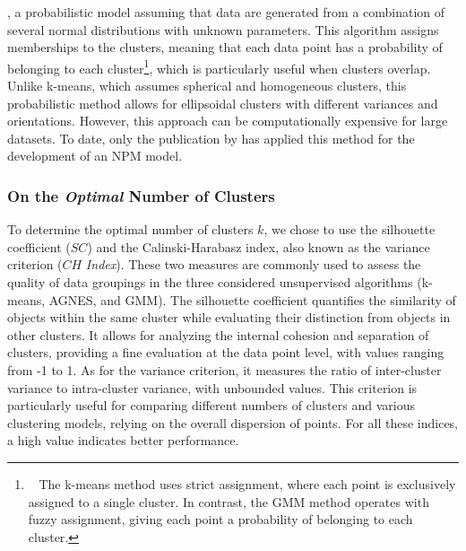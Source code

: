 \begin{refsegment}
\begin{customitemize}
{    }, a probabilistic model assuming that data are generated from a combination of several normal distributions with unknown parameters. This algorithm assigns  memberships to the clusters, meaning that each data point has a probability of belonging to each cluster\footnote{~
        The k-means method uses strict assignment, where each point is exclusively assigned to a single cluster. In contrast, the \acrshort{GMM} method operates with fuzzy assignment, giving each point a probability of belonging to each cluster.
    }, which is particularly useful when clusters overlap. Unlike k-means, which assumes spherical and homogeneous clusters, this probabilistic method allows for ellipsoidal clusters with different variances and orientations. However, this approach can be computationally expensive for large datasets. To date, only the publication by \textcolor{blue}{\textcite[5]{caset_integrating_2020}} has applied this method for the development of an \acrshort{NPM} model.
\end{customitemize}%

\subsubsection*{On the \textsl{Optimal} Number of Clusters
    \label{chap6:methodologie-statistiques-nombre-clusters}
    }

To determine the optimal number of clusters \(k\), we chose to use the silhouette coefficient (\(SC\)) and the Calinski-Harabasz index, also known as the variance criterion (\(CH\) \textsl{Index}). These two measures are commonly used to assess the quality of data groupings in the three considered unsupervised algorithms (k-means, \acrshort{AGNES}, and \acrshort{GMM}). The silhouette coefficient quantifies the similarity of objects within the same cluster while evaluating their distinction from objects in other clusters. It allows for analyzing the internal cohesion and separation of clusters, providing a fine evaluation at the data point level, with values ranging from -1 to 1. As for the variance criterion, it measures the ratio of inter-cluster variance to intra-cluster variance, with unbounded values. This criterion is particularly useful for comparing different numbers of clusters and various clustering models, relying on the overall dispersion of points. For all these indices, a high value indicates better performance.%


\end{refsegment}
